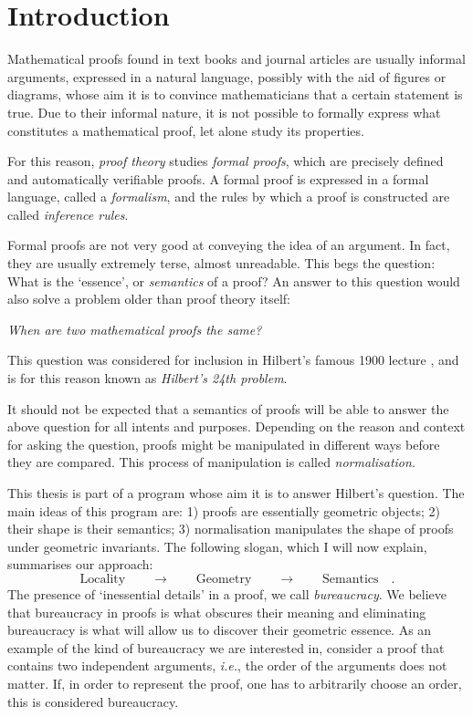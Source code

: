 \chapter{Introduction}

Mathematical proofs found in text books and journal articles are usually informal arguments, expressed in a natural language, possibly with the aid of figures or diagrams, whose aim it is to convince mathematicians that a certain statement is true. Due to their informal nature, it is not possible to formally express what constitutes a mathematical proof, let alone study its properties.

For this reason, \emph{proof theory} studies \emph{formal proofs}, which are precisely defined and automatically verifiable proofs. A formal proof is expressed in a formal language, called a \emph{formalism}, and the rules by which a proof is constructed are called \emph{inference rules}.   

Formal proofs are not very good at conveying the idea of an argument. In fact, they are usually extremely terse, almost unreadable. This begs the question: What is the `essence', or \emph{semantics} of a proof? An answer to this question would also solve a problem older than proof theory itself:

\emph{When are two mathematical proofs the same?}

This question was considered for inclusion in Hilbert's famous 1900 lecture \cite{Thie:03:Hilberts:yu}, and is for this reason known as \emph{Hilbert's 24th problem}.

It should not be expected that a semantics of proofs will be able to answer the above question for all intents and purposes. Depending on the reason and context for asking the question, proofs might be manipulated in different ways before they are compared. This process of manipulation is called \emph{normalisation}.


This thesis is part of a program whose aim it is to answer Hilbert's question. The main ideas of this program are: 1) proofs are essentially geometric objects; 2) their shape is their semantics; 3) normalisation manipulates the shape of proofs under geometric invariants. The following slogan, which I will now explain, summarises our approach:
\[
\mbox{Locality}\qquad\rightarrow\qquad\mbox{Geometry}\qquad\rightarrow\qquad\mbox{Semantics}\quad.
\]
The presence of `inessential details' in a proof, we call \emph{bureaucracy}. We believe that bureaucracy in proofs is what obscures their meaning and eliminating bureaucracy is what will allow us to discover their geometric essence. As an example of the kind of bureaucracy we are interested in, consider a proof that contains two independent arguments, \emph{i.e.}, the order of the arguments does not matter. If, in order to represent the proof, one has to arbitrarily choose an order, this is considered bureaucracy.


